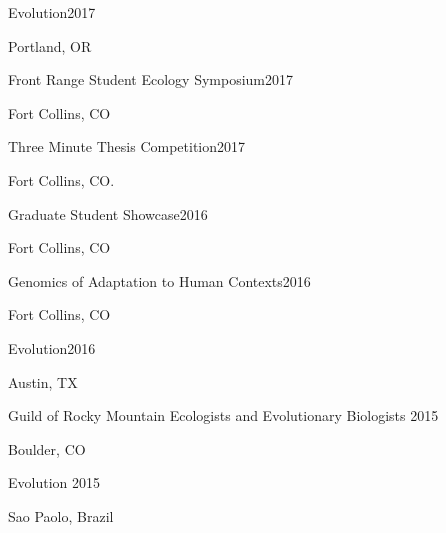 \documentclass[12pt,english]{article}
\begin{document}
\hspace*{1.0em}Evolution\hfill 2017 \par
\hspace*{2.0em}Portland, OR \par\vspace{0.5ex}

\hspace*{1.0em}Front Range Student Ecology Symposium\hfill 2017 \par
\hspace*{2.0em}Fort Collins, CO \par\vspace{0.5ex}

\hspace*{1.0em}Three Minute Thesis Competition\hfill 2017 \par
\hspace*{2.0em}Fort Collins, CO. \par\vspace{0.5ex}

\hspace*{1.0em}Graduate Student Showcase\hfill 2016 \par
\hspace*{2.0em}Fort Collins, CO \par\vspace{0.5ex}

\hspace*{1.0em}Genomics of Adaptation to Human Contexts\hfill 2016 \par
\hspace*{2.0em}Fort Collins, CO \par\vspace{0.5ex}

\hspace*{1.0em}Evolution\hfill 2016 \par
\hspace*{2.0em}Austin, TX \par\vspace{0.5ex}

\hspace*{1.0em}Guild of Rocky Mountain Ecologists and Evolutionary Biologists \hfill 2015 \par
\hspace*{2.0em}Boulder, CO \par\vspace{0.5ex}

\hspace*{1.0em}Evolution \hfill 2015 \par
\hspace*{2.0em}Sao Paolo, Brazil \par\vspace{0.5ex}
\end{document}
